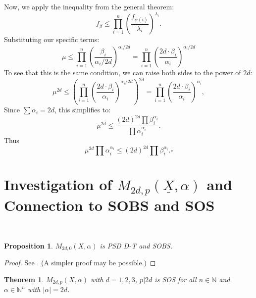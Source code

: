 \documentclass{article}
\newtheorem{theorem}{Theorem}
\newtheorem{proposition}{Proposition}
\begin{document}
Now, we apply the inequality from the general theorem:
$$f_{\beta}\le\prod_{i=1}^{n}(\frac{f_{\alpha(i)}}{\lambda_{i}})^{\lambda_{i}}.$$
Substituting our specific terms:
$$\mu\le\prod_{i=1}^{n}(\frac{\beta_{i}}{\alpha_{i}/2d})^{\alpha_{i}/2d}=\prod_{i=1}^{n}(\frac{2d\cdot\beta_{i}}{\alpha_{i}} )^{\alpha_{i} / 2d}$$
To see that this is the same condition, we can raise both sides to the power of $2d$:
$$\mu^{2d}\le(\prod_{i=1}^{n}(\frac{2d\cdot\beta_{i}}{\alpha_{i}})^{\alpha_{i}/2d} )^{2d}=\prod_{i=1}^{n}(\frac{2d\cdot\beta_{i}}{\alpha_{i}})^{\alpha_{i}},$$ Since $\sum\alpha_i=2d$, this simplifies to:
$$\mu^{2d} \le \frac{(2d)^{2d} \prod \beta_i^{\alpha_i}}{\prod \alpha_i^{\alpha_i}}.$$
Thus
$$\mu^{2d}\prod \alpha_i^{\alpha_i}\le(2d)^{2d} \prod \beta_i^{\alpha_i}.\square$$

\section{Investigation of $M_{2d, p}(\underline{X}, \alpha)$ and Connection to SOBS and SOS}
\label{s03}
~~
\begin{proposition}
$M_{2d,0}(X, \alpha)$ is PSD D-T and SOBS.
\end{proposition}

\begin{proof}
See \cite{GM01}. (A simpler proof may be possible.)
\end{proof}

\begin{theorem}
$M_{2d,p}(X, \alpha)$ with $d=1,2,3$, $p|2d$ is SOS for all $n \in \mathbb{N}$ and $\alpha \in \mathbb{N}^n$ with
$|\alpha|=2d$.
\end{theorem}
\end{document}
